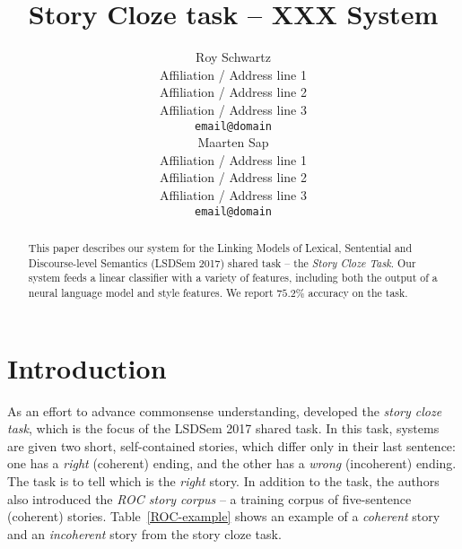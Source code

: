 \documentclass[11pt]{article}
\title{Story Cloze task -- XXX System}
\author{Roy Schwartz\\
  Affiliation / Address line 1 \\
  Affiliation / Address line 2 \\
  Affiliation / Address line 3 \\
  {\tt email@domain} \\\And	
  Maarten Sap \\
  Affiliation / Address line 1 \\
  Affiliation / Address line 2 \\
  Affiliation / Address line 3 \\
  {\tt email@domain} \\}
\date{}
\newcommand{\ms}[1]{{\color{cyan}\{\textit{#1}\}$_{ms}$}}
\newcommand{\tabref}[1]{Table~\ref{#1}}
\newcommand{\com}[1]{}
\begin{document}
\maketitle
\begin{abstract} %
This paper describes our system for the Linking Models of Lexical, Sentential and Discourse-level Semantics (LSDSem 2017) shared task -- the \textit{Story Cloze Task}.
%
Our system feeds a linear classifier with a variety of features, including both the output of a neural language model and style features. %
We report  $75.2\%$ accuracy on the task.
\end{abstract}

\section{Introduction}
As an effort to advance commonsense  understanding,  developed the \textit{story cloze task}, which is the focus of the LSDSem 2017 shared task. 
In this task, systems are given two short, self-contained stories, which differ only in their last sentence: 
one has a {\it right} (coherent) ending, and the other has a {\it wrong} (incoherent) ending.
The task is to tell which is the {\it right} story.
In addition to the task, the authors also introduced the {\it ROC story corpus} --  a training corpus of five-sentence (coherent) stories. 
\tabref{ROC-example} shows an example of a {\it coherent} story and an {\it incoherent} story from the story cloze task.


\com{
Learning of commonsense knowledge is one of AI's biggest challenges, since it is not usually found in knowledge bases.
Coming up with the right types of data to analyze has been hard, and models are also not working well.

One particular type of commonsense knowledge that has gotten attention is story understanding \cite{??}. 
Stories have narratives that require understanding of how events typically flow and of what events are coherent after others.
Related to understanding event sequences is script learning, which focuses on stereotypical chains of events.

The 2017 LSD Sem Shared Task provide a testbed to further commonsense story understanding: the \textit{Story Cloze} task \cite{Mostafazadeh:2016}. Specifically designed for the purpose of facilitating the learning of commonsense knowledge, the task consist of finding the \textit{corrent} ending to four sentence short stories, out of two possible endings.
}
\end{document}
